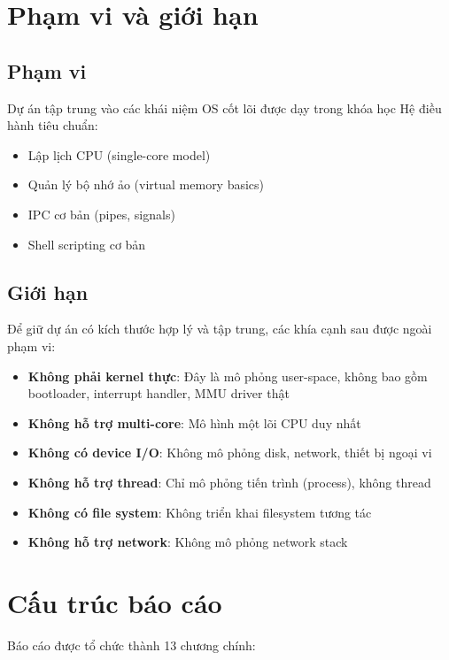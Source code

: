 \section{Phạm vi và giới hạn}

\subsection*{Phạm vi}

Dự án tập trung vào các khái niệm OS cốt lõi được dạy trong khóa học Hệ điều hành tiêu chuẩn:

\begin{itemize}[leftmargin=1.5cm]
  \item Lập lịch CPU (single-core model)
  \item Quản lý bộ nhớ ảo (virtual memory basics)
  \item IPC cơ bản (pipes, signals)
  \item Shell scripting cơ bản
\end{itemize}

\subsection*{Giới hạn}

Để giữ dự án có kích thước hợp lý và tập trung, các khía cạnh sau được ngoài phạm vi:

\begin{itemize}[leftmargin=1.5cm]
  \item \textbf{Không phải kernel thực}: Đây là mô phỏng user-space, không bao gồm bootloader, 
  interrupt handler, MMU driver thật
  \item \textbf{Không hỗ trợ multi-core}: Mô hình một lõi CPU duy nhất
  \item \textbf{Không có device I/O}: Không mô phỏng disk, network, thiết bị ngoại vi
  \item \textbf{Không hỗ trợ thread}: Chỉ mô phỏng tiến trình (process), không thread
  \item \textbf{Không có file system}: Không triển khai filesystem tương tác
  \item \textbf{Không hỗ trợ network}: Không mô phỏng network stack
\end{itemize}

\section{Cấu trúc báo cáo}

Báo cáo được tổ chức thành 13 chương chính:

